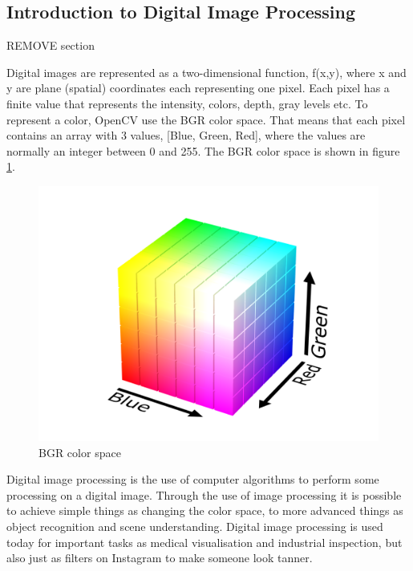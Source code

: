 
\subsection{Introduction to Digital Image Processing}
{\color{red} REMOVE section}
 
Digital images are represented as a two-dimensional function, f(x,y), where x and y are plane (spatial) coordinates each representing one pixel. Each pixel has a finite value that represents the intensity, colors, depth, gray levels etc. To represent a color, OpenCV use the BGR color space. That means that each pixel contains an array with 3 values, [Blue, Green, Red], where the values are normally an integer between 0 and 255. The BGR color space is shown in figure \ref{fig:bgr_color_space}.

\begin{figure}[h]
    \centering
    \includegraphics[width=.9\linewidth]{images/introduction/RGB_color_solid_cube}
    \caption{BGR color space}
    \label{fig:bgr_color_space}
\end{figure}

Digital image processing is the use of computer algorithms to perform some processing on a digital image. Through the use of image processing it is possible to achieve simple things as changing the color space, to more advanced things as object recognition and scene understanding. Digital image processing is used today for important tasks as medical visualisation and industrial inspection, but also just as filters on Instagram to make someone look tanner. 

